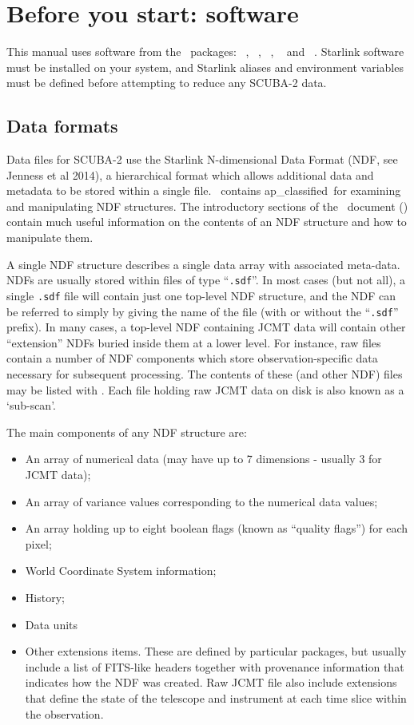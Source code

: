 \section{Before you start: software}

This manual uses software from the \starlink\ packages: \smurf\
\cite{smurf}, \Kappa\ \cite{kappa}, \gaia\ \cite{gaia}, \oracdr\
\cite{oracdr} and \picard\ \cite{picard}. Starlink software must be
installed on your system, and Starlink aliases and environment
variables must be defined before attempting to reduce any SCUBA-2
data.

\subsection{Data formats}
\label{sec:ndf}

Data files for SCUBA-2 use the Starlink N-dimensional Data Format (NDF,
see Jenness et al 2014\cite{ndf}), a hierarchical format which allows
additional data and metadata to be stored within a single file. \Kappa\
contains  {ap_classified}\ for examining and
manipulating NDF structures. The introductory sections of the \Kappa\
document () contain much useful information on
the contents of an NDF structure and how to manipulate them.

A single NDF structure describes a single data array with associated
meta-data. NDFs are usually stored within files of type ``\verb+.sdf+''.
In most cases (but not all), a single \verb+.sdf+ file will contain just
one top-level NDF structure, and the NDF can be referred to simply by
giving the name of the file (with or without the ``\verb+.sdf+'' prefix).
In many cases, a top-level NDF containing JCMT data will contain other
``extension'' NDFs buried inside them at a lower level. For instance, raw
files contain a number of NDF components which store observation-specific
data necessary for subsequent processing. The contents of these (and
other NDF) files may be listed with \HDSTRACEref. Each file holding raw
JCMT data on disk is also known as a `sub-scan'.

The main components of any NDF structure are:
\begin{itemize}
\item An array of numerical data (may have up to 7 dimensions - usually 3
for JCMT data);
\item An array of variance values corresponding to the numerical data
values;
\item An array holding up to eight boolean flags (known as ``quality
flags'') for each pixel;
\item World Coordinate System information;
\item History;
\item Data units
\item Other extensions items. These are defined by particular packages,
but usually include a list of FITS-like headers together with provenance
information that indicates how the NDF was created. Raw JCMT file also
include extensions that define the state of the telescope and instrument
at each time slice within the observation.
\end{itemize}

